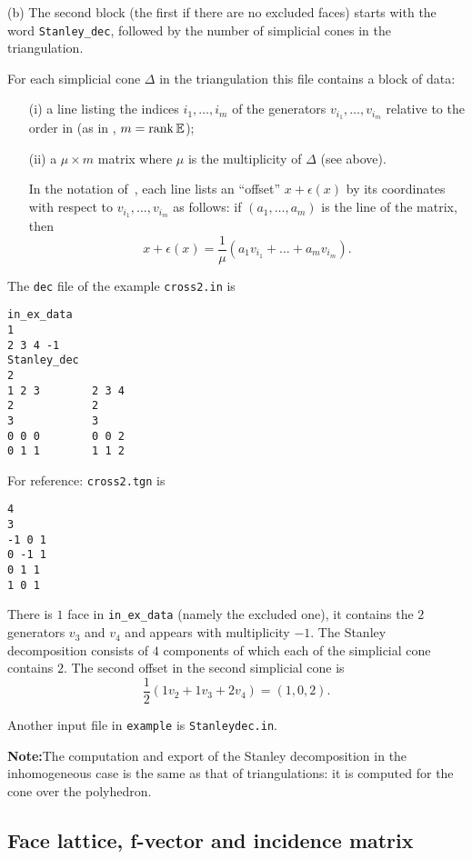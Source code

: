 (b) The second block (the first if there are no excluded faces) starts with
the word \verb|Stanley_dec|, followed by the number of simplicial cones in the
triangulation.

For each simplicial cone $\Delta$ in the
triangulation this file contains a block of data:
\begin{enumerate}
	\item[(i)] a line listing the indices $i_1,\dots,i_m$ of the
	generators $v_{i_1},\dots,v_{i_m}$ relative to the
	order in  (as in , $m=\operatorname{rank} {\mathbb E}$);
	
	\item[(ii)] a $\mu\times m$ matrix where $\mu$ is the
	multiplicity of $\Delta$ (see above).
	
	In the notation of~\cite{BIS}, each line lists an
	``offset'' $x+\epsilon(x)$ by its coordinates with
	respect to $v_{i_1},\dots,v_{i_m}$ as follows: if
	$(a_1,\dots,a_m)$ is the line of the matrix, then
	$$
	x+\epsilon(x)=\frac{1}{\mu}(a_1v_{i_1}+\dots+a_mv_{i_m}).
	$$
\end{enumerate}


The \verb|dec| file of the example \verb|cross2.in| is
\begin{Verbatim}
in_ex_data
1
2 3 4 -1
Stanley_dec
2
1 2 3        2 3 4 
2            2
3            3
0 0 0        0 0 2 
0 1 1        1 1 2 
\end{Verbatim}
For reference: \verb|cross2.tgn| is
\begin{Verbatim}
4
3
-1 0 1 
0 -1 1 
0 1 1 
1 0 1 
\end{Verbatim}

There is $1$ face in \verb|in_ex_data| (namely the excluded one), it contains the $2$ generators $v_3$ and $v_4$ and appears with multiplicity $-1$. The Stanley decomposition consists of $4$ components of which each of the simplicial cone contains $2$. The second offset in the second simplicial cone is
$$
\frac12 (1v_2+1v_3+2v_4)=(1,0,2).
$$

Another input file in \verb|example| is \verb|Stanleydec.in|.

\textbf{Note:}\enspace The computation and export of the Stanley decomposition in the inhomogeneous case is the same as that of triangulations: it is computed for the cone over the polyhedron.

\subsection{Face lattice, f-vector and incidence matrix}\label{FaceLattice}

